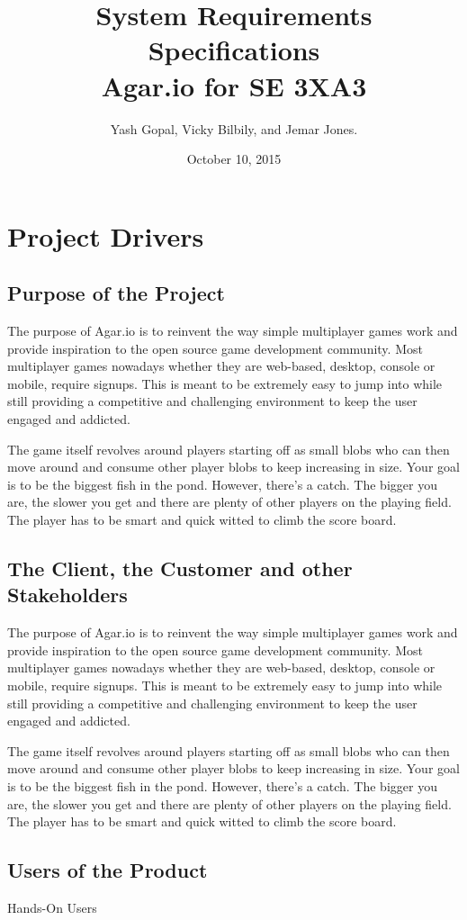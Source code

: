 \documentclass[12pt]{article}
\title{System Requirements Specifications\\
	\large Agar.io for SE 3XA3}
\author{Yash Gopal, Vicky Bilbily, and Jemar Jones.}
\date{October 10, 2015}
\begin{document}
\maketitle
\tableofcontents
\newpage

\section{Project Drivers}
\subsection{Purpose of the Project}
The purpose of Agar.io is to reinvent the way simple multiplayer games work and provide inspiration to the open source game development community. Most multiplayer games nowadays whether they are web-based, desktop, console or mobile, require signups. This is meant to be extremely easy to jump into while still providing a competitive and challenging environment to keep the user engaged and addicted.

The game itself revolves around players starting off as small blobs who can then move around and consume other player blobs to keep increasing in size. Your goal is to be the biggest fish in the pond. However, there’s a catch. The bigger you are, the slower you get and there are plenty of other players on the playing field. The player has to be smart and quick witted to climb the score board.
\subsection{The Client, the Customer and other Stakeholders}
The purpose of Agar.io is to reinvent the way simple multiplayer games work and provide inspiration to the open source game development community. Most multiplayer games nowadays whether they are web-based, desktop, console or mobile, require signups. This is meant to be extremely easy to jump into while still providing a competitive and challenging environment to keep the user engaged and addicted.

The game itself revolves around players starting off as small blobs who can then move around and consume other player blobs to keep increasing in size. Your goal is to be the biggest fish in the pond. However, there’s a catch. The bigger you are, the slower you get and there are plenty of other players on the playing field. The player has to be smart and quick witted to climb the score board.
\subsection{Users of the Product}
Hands-On Users
\end{document}

